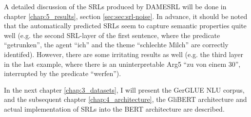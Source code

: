 A detailed discussion of the SRLs produced by DAMESRL will be done in chapter
\ref{chap:5_results}, section \ref{sec:sec:srl-noise}. In advance, it should be
noted that the automatically predicted SRLs seem to capture semantic properties
quite well (e.g. the second SRL-layer of the first sentence, where the predicate
``getrunken'', the agent ``ich'' and the theme ``schlechte Milch'' are correctly
identifed). However, there are some irritating results as well (e.g. the third
layer in the last example, where there is an uninterpretable Arg5 ``zu von einem
30'', interrupted by the predicate ``werfen'').

In the next chapter \ref{chap:3_datasets}, I will present the GerGLUE NLU corpus, and
the subsequent chapter \ref{chap:4_architecture}, the GliBERT architecture and actual
implementation of SRLs into the BERT architecture are described.


